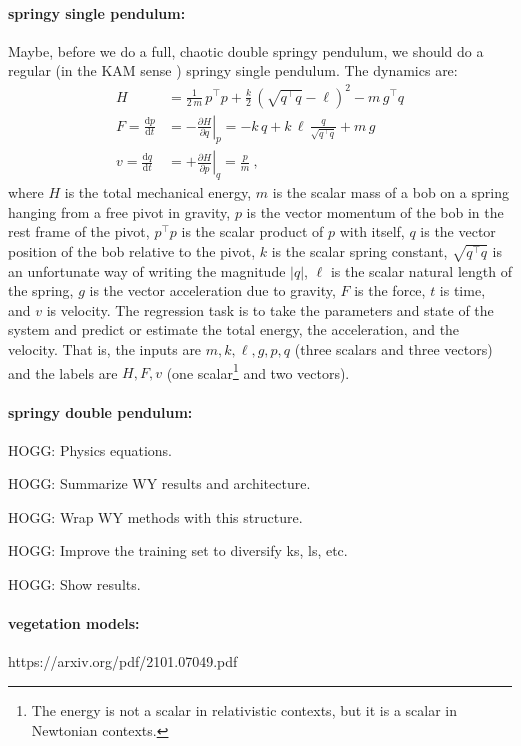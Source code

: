 \documentclass[12pt, letterpaper]{article}
\newcommand{\dd}{\mathrm{d}}
\begin{document}
\paragraph{springy single pendulum:} Maybe, before we do a full, chaotic double springy pendulum, we should do a regular (in the KAM sense \cite{kam}) springy single pendulum. The dynamics are:
\begin{align}
    H &= \frac{1}{2\,m}\,p^\top p + \frac{k}{2}\,(\sqrt{q^\top q} - \ell)^2 - m\,g^\top q \\
    F = \frac{\dd p}{\dd t} &= -\left.\frac{\partial H}{\partial q}\right|_p = -k\,q + k\,\ell\,\frac{q}{\sqrt{q^\top q}} + m\,g \\
    v = \frac{\dd q}{\dd t} &= +\left.\frac{\partial H}{\partial p}\right|_q = \frac{p}{m} ~,
\end{align}
where $H$ is the total mechanical energy, $m$ is the scalar mass of a bob on a spring hanging from a free pivot in gravity, $p$ is the vector momentum of the bob in the rest frame of the pivot, $p^\top p$ is the scalar product of $p$ with itself, $q$ is the vector position of the bob relative to the pivot, $k$ is the scalar spring constant, $\sqrt{q^\top q}$ is an unfortunate way of writing the magnitude $|q|$, $\ell$ is the scalar natural length of the spring, $g$ is the vector acceleration due to gravity, $F$ is the force, $t$ is time, and $v$ is velocity.
The regression task is to take the parameters and state of the system and predict or estimate the total energy, the acceleration, and the velocity.
That is, the inputs are $m,k,\ell,g,p,q$ (three scalars and three vectors) and the labels are $H,F,v$ (one scalar\footnote{The energy is not a scalar in relativistic contexts, but it is a scalar in Newtonian contexts.} and two vectors).

\paragraph{springy double pendulum:}
HOGG: Physics equations.

HOGG: Summarize WY results and architecture.

HOGG: Wrap WY methods with this structure.

HOGG: Improve the training set to diversify ks, ls, etc.

HOGG: Show results.

\paragraph{vegetation models:} https://arxiv.org/pdf/2101.07049.pdf
\end{document}
